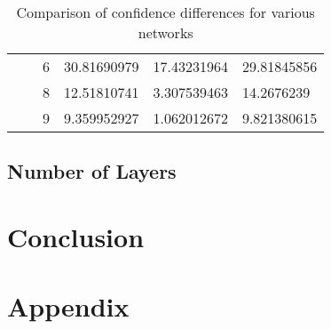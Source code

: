 \documentclass{article}
\begin{document}
\begin{table}[h]
\begin{tabular}{|l|l|l|l|l|l|}
                              &                       & 6     & 30.81690979 & 17.43231964 & 29.81845856  \\ \cline{3-6} 
                              &                       & 8     & 12.51810741 & 3.307539463 & 14.2676239   \\ \cline{3-6} 
                              &                       & 9     & 9.359952927 & 1.062012672 & 9.821380615  \\ \hline
\end{tabular}
\caption{Comparison of confidence differences for various networks}
\end{table}

\subsection{Number of Layers}





\section{Conclusion}




\section{Appendix}
\end{document}
